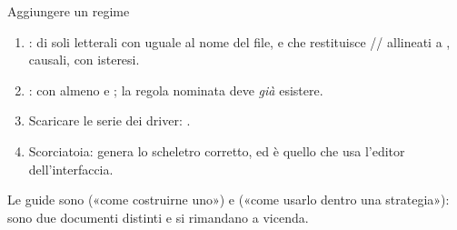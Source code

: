\begin{pratica}{Aggiungere un regime}
\begin{enumerate}
  \item {}:  di soli letterali con
         uguale al nome del file, e  che
        restituisce // allineati a
        , causali, con isteresi.
  \item {}:  con almeno
         e ; la regola nominata deve \emph{già} esistere.
  \item Scaricare le serie dei driver:
        .
  \item Scorciatoia:  genera lo scheletro
        corretto, ed è quello che usa l'editor dell'interfaccia.
\end{enumerate}
Le guide sono  («come costruirne uno») e
 («come usarlo dentro una strategia»): sono
due documenti distinti e si rimandano a vicenda.
\end{pratica}
